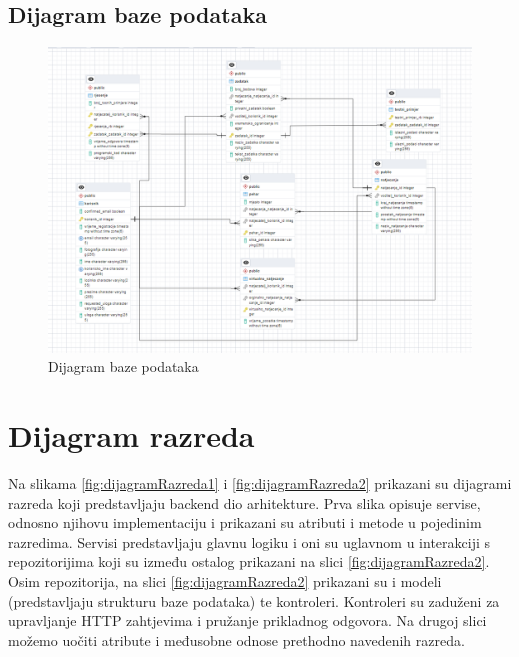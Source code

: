 		
\pagebreak
\subsection{Dijagram baze podataka}
\begin{figure}[H]
	\includegraphics[scale=0.7]{dijagrami/dijagram_baze_podataka.png}
	\centering
	\caption{Dijagram baze podataka}
	\label{fig:bazaPodataka} 
\end{figure}

\eject


\section{Dijagram razreda}

Na slikama \ref{fig:dijagramRazreda1} i \ref{fig:dijagramRazreda2} prikazani su dijagrami razreda koji predstavljaju backend dio arhitekture.
Prva slika opisuje servise, odnosno njihovu implementaciju i prikazani su atributi i metode u pojedinim razredima.
Servisi predstavljaju glavnu logiku i oni su uglavnom u interakciji s repozitorijima koji su između ostalog prikazani na slici \ref{fig:dijagramRazreda2}.
Osim repozitorija, na slici \ref{fig:dijagramRazreda2} prikazani su i modeli (predstavljaju strukturu baze podataka) te kontroleri. 
Kontroleri su zaduženi za upravljanje HTTP zahtjevima i pružanje prikladnog odgovora. Na drugoj slici možemo uočiti atribute i međusobne odnose prethodno navedenih razreda. \\

